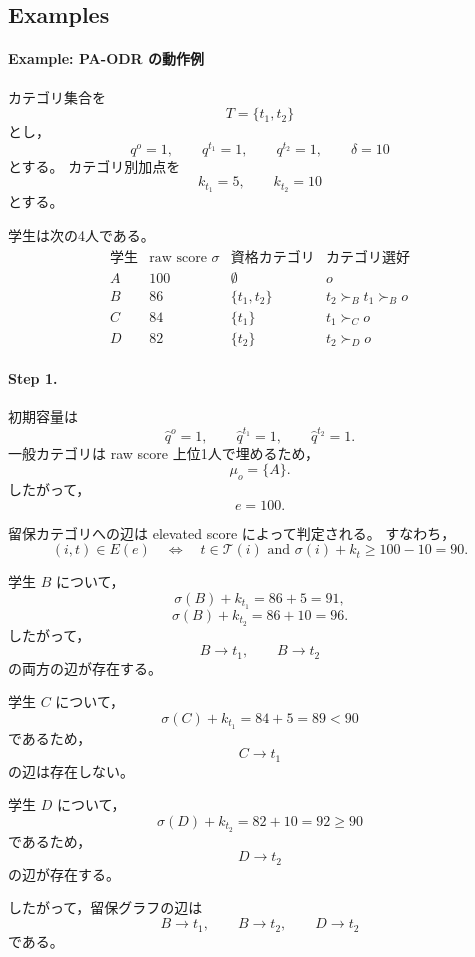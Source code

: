 \documentclass[
  12pt,
  a4paper,
  oneside,
  onecolumn,
  titlepage,
  final
]{jsarticle}
\newcommand{\1}{\mathbf{1}}
\begin{document}
\subsection{Examples}

\paragraph{Example: PA-ODR の動作例}
\label{ex:pa-odr-main}
カテゴリ集合を
\[
    T=\{t_1,t_2\}
\]
とし，
\[
    q^o=1,
    \qquad
    q^{t_1}=1,
    \qquad
    q^{t_2}=1,
    \qquad
    \delta=10
\]
とする。
カテゴリ別加点を
\[
    k_{t_1}=5,
    \qquad
    k_{t_2}=10
\]
とする。

学生は次の4人である。
\[
\begin{array}{c|c|c|c}
\text{学生} & \text{raw score } \sigma & \text{資格カテゴリ} & \text{カテゴリ選好} \\
\hline
A & 100 & \emptyset & o \\
B & 86  & \{t_1,t_2\} & t_2\succ_B t_1\succ_B o \\
C & 84  & \{t_1\} & t_1\succ_C o \\
D & 82  & \{t_2\} & t_2\succ_D o
\end{array}
\]

\paragraph{Step 1.}
初期容量は
\[
    \hat q^o=1,
    \qquad
    \hat q^{t_1}=1,
    \qquad
    \hat q^{t_2}=1.
\]
一般カテゴリは raw score 上位1人で埋めるため，
\[
    \mu_o=\{A\}.
\]
したがって，
\[
    e=100.
\]

留保カテゴリへの辺は elevated score によって判定される。
すなわち，
\[
    (i,t)\in E(e)
    \quad\Longleftrightarrow\quad
    t\in\mathcal T(i)
    \text{ and }
    \sigma(i)+k_t\ge 100-10=90.
\]

学生 $B$ について，
\[
    \sigma(B)+k_{t_1}=86+5=91,
\]
\[
    \sigma(B)+k_{t_2}=86+10=96.
\]
したがって，
\[
    B\to t_1,
    \qquad
    B\to t_2
\]
の両方の辺が存在する。

学生 $C$ について，
\[
    \sigma(C)+k_{t_1}=84+5=89<90
\]
であるため，
\[
    C\to t_1
\]
の辺は存在しない。

学生 $D$ について，
\[
    \sigma(D)+k_{t_2}=82+10=92\ge 90
\]
であるため，
\[
    D\to t_2
\]
の辺が存在する。

したがって，留保グラフの辺は
\[
    B\to t_1,
    \qquad
    B\to t_2,
    \qquad
    D\to t_2
\]
である。
\end{document}
